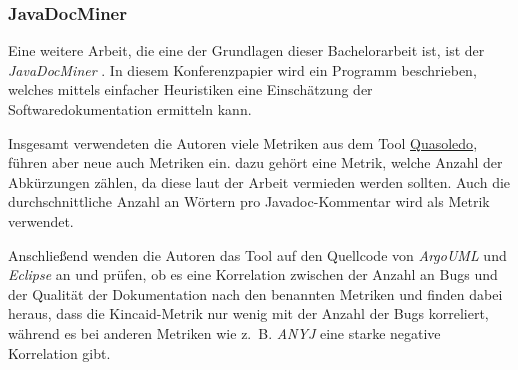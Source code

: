 \subsubsection{JavaDocMiner}
Eine weitere Arbeit, die eine der Grundlagen dieser Bachelorarbeit ist, ist der \textit{JavaDocMiner} \cite[S.~68-79]{AutomaticQualityAssessmentofSourceCodeComments:TheJavadocMiner}. In diesem Konferenzpapier wird ein Programm beschrieben, welches mittels einfacher Heuristiken eine Einschätzung der Softwaredokumentation ermitteln kann.

Insgesamt verwendeten die Autoren viele Metriken aus dem Tool \hyperref[chapter:Quasoledo]{Quasoledo}, führen aber neue auch Metriken ein. dazu gehört eine Metrik, welche Anzahl der Abkürzungen zählen, da diese laut der Arbeit vermieden werden sollten. Auch die durchschnittliche Anzahl an Wörtern pro Javadoc-Kommentar wird als Metrik verwendet. 

Anschließend wenden die Autoren das Tool auf den Quellcode von \textit{ArgoUML} und \textit{Eclipse} an und prüfen, ob es eine Korrelation zwischen der Anzahl an Bugs und der Qualität der Dokumentation nach den benannten Metriken und finden dabei heraus, dass die Kincaid-Metrik nur wenig mit der Anzahl der Bugs korreliert, während es bei anderen Metriken wie z.~B. \textit{ANYJ} eine starke negative Korrelation gibt. 

